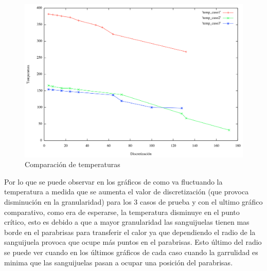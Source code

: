 \begin{figure}[htb]
\begin{center}
        \includegraphics[scale=0.5]{imagenes/comparacion_temperatura.png}
                \caption{Comparación de temperaturas}
        \end{center}

\end{figure}

Por lo que se puede observar en los gráficos de como va fluctuando la temperatura a medida que se aumenta el valor de discretización (que provoca disminución en la granularidad) para los 3 casos de prueba y con el ultimo gráfico comparativo, como era de esperarse, la temperatura disminuye en el punto crítico, esto es debido a que a mayor granularidad las sanguijuelas tienen mas borde en el parabrisas para transferir el calor ya que dependiendo el radio de la sanguijuela provoca que ocupe más puntos en el parabrisas. Esto último del radio se puede ver cuando en los últimos gráficos de cada caso cuando la garrulidad es minima que las sanguijuelas pasan a ocupar una posición del parabrisas.

\newpage

